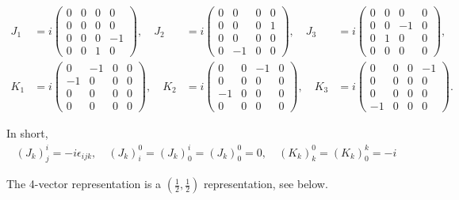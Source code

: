\begin{example}
    \begin{align*}
        J_1 &= i\begin{pmatrix}
            0 & 0 & 0 & 0 \\
            0 & 0 & 0 & 0 \\
            0 & 0 & 0 & -1 \\
            0 & 0 & 1 & 0
        \end{pmatrix}, \quad
        J_2 &= i\begin{pmatrix}
            0 & 0 & 0 & 0 \\
            0 & 0 & 0 & 1 \\
            0 & 0 & 0 & 0 \\
            0 & -1 & 0 & 0
        \end{pmatrix}, \quad
        J_3 &= i\begin{pmatrix}
            0 & 0 & 0 & 0 \\
            0 & 0 & -1 & 0 \\
            0 & 1 & 0 & 0 \\
            0 & 0 & 0 & 0
        \end{pmatrix}, \\
        K_1 &= i\begin{pmatrix}
            0 & -1 & 0 & 0 \\
            -1 & 0 & 0 & 0 \\
            0 & 0 & 0 & 0 \\
            0 & 0 & 0 & 0
        \end{pmatrix}, \quad
        K_2 &= i\begin{pmatrix}
            0 & 0 & -1 & 0 \\
            0 & 0 & 0 & 0 \\
            -1 & 0 & 0 & 0 \\
            0 & 0 & 0 & 0
        \end{pmatrix}, \quad
        K_3 &= i\begin{pmatrix}
            0 & 0 & 0 & -1 \\
            0 & 0 & 0 & 0 \\
            0 & 0 & 0 & 0 \\
            -1 & 0 & 0 & 0
        \end{pmatrix}.
    \end{align*}

    In short,
\begin{align*}
    (J_k)^i_j = - i \epsilon_{ijk}, \quad
    (J_k)^0_i = (J_k)^i_0 = (J_k)^0_0 = 0, \quad
    (K_k)^0_k = (K_k)^k_0 = -i
\end{align*}

The 4-vector representation is a $(\frac{1}{2}, \frac{1}{2})$ representation, see below.
\end{example}

